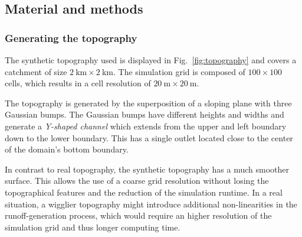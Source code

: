 
\subsection{Material and methods}
\subsubsection{Generating the topography}

The synthetic topography used is displayed in Fig.~\ref{fig:topography} and covers a catchment of size $\SI{2}{\kilo\meter} \times \SI{2}{\kilo\meter}$. 
The simulation grid is composed of $\num{100} \times \num{100}$ cells, which results in a cell resolution of $\SI{20}{\meter} \times \SI{20}{\meter}.$

The topography is generated by the superposition of a sloping plane with three Gaussian bumps.
The Gaussian bumps have different heights and widths and generate a \emph{Y-shaped channel} which extends from the upper and left boundary down to the lower boundary.
This has a single outlet located close to the center of the domain's bottom boundary.

In contrast to real topography, the synthetic topography has a much smoother surface. This allows the use of a coarse grid resolution without losing the topographical features and the reduction of the simulation runtime. 
In a real situation, a wigglier topography might introduce additional non-linearities in the runoff-generation process, which would require an higher resolution of the simulation grid and thus longer computing time.

